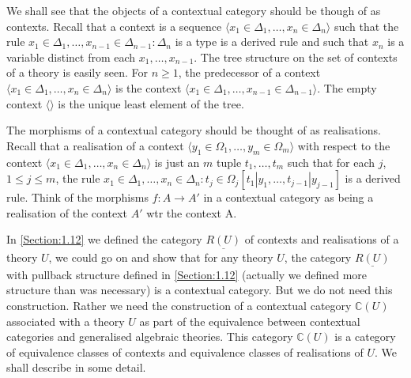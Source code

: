 We shall see that the objects of a contextual category should be though of as contexts.
%
Recall that a context is a sequence \( \langle x_1 \in \Delta_1, \ldots, x_n \in \Delta_n \rangle\) such that the rule \(x_1 \in \Delta_1, \ldots, x_{n-1} \in \Delta_{n-1} : \Delta_n\) is a type    is a derived rule and such that \(x_n\) is a variable distinct from each \(x_1, \ldots, x_{n-1}\).
The tree structure on the set of contexts of a theory is easily seen.
%
For \(n \geq 1\), the predecessor of a context \(\langle x_1 \in \Delta_1, \ldots, x_n \in \Delta_n \rangle\) is the context \(\langle x_1 \in \Delta_1, \ldots, x_{n-1} \in \Delta_{n-1} \rangle\).
%
The empty context \(\langle  \rangle\) is the unique least element of the tree.

The morphisms of a contextual category should be thought of as realisations. Recall that a realisation of a context \(\langle y_1 \in \Omega_1, \ldots, y_m \in \Omega_m \rangle\) with respect to the context $\langle  x_1 \in \Delta_1, \ldots, x_n \in \Delta_n \rangle$ is just an \(m\) tuple \(t_1, \ldots, t_m\) such that for each \(j\), \(1 \leq j \leq m\), the rule \(x_1 \in \Delta_1, \ldots, x_n \in \Delta_n : t_j \in \Omega_j [t_1|y_1, \ldots, t_{j-1}|y_{j-1}]\) is a derived rule.
%
Think of the morphisms \(f:A \rightarrow A'\) in a contextual category as being a realisation of the context \(A'\) wtr the context A.

In \ref{Section:1.12} we defined the category \(\underline{R(U)}\) of contexts and realisations of a theory \(U\),  we could go on and show that for any theory \(U\), the category \(\underline{R(U)}\) with pullback structure defined in \ref{Section:1.12} (actually we defined more structure than was necessary) is a contextual category.
%
But we do not need this construction.
%
Rather we need the construction of a contextual category \(\mathbb C (U)\) associated with a theory \(U\) as part of the equivalence between contextual categories and generalised algebraic theories.
%
This category \(\mathbb C (U)\) is a category of equivalence classes of contexts and equivalence classes of realisations of \(U\).
%
We shall describe in some detail.


